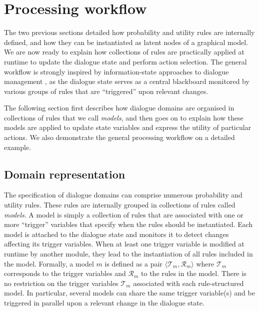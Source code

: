 %

\section{Processing workflow}
\label{sec:processing-workflow}

The two previous sections detailed how probability and utility rules are internally defined, and how they can be instantiated as latent nodes of a graphical model. We are now ready to explain how collections of rules are practically applied at runtime to update the dialogue state and perform action selection. The general workflow is strongly inspired by information-state approaches to dialogue management \citep{Larsson:2000}, as the dialogue state serves as a central blackboard monitored by various groups of rules that are ``triggered'' upon relevant changes. 

The following section first describes how dialogue domains are organised in collections of rules that we call \textit{models}, and then goes on to explain how these models are applied to update state variables and express the utility of particular actions. We also demonstrate the general processing workflow on a detailed example. 


\subsection{Domain representation}

The specification of dialogue domains can comprise numerous probability and utility rules. These rules are internally grouped in collections of rules called \textit{models}. A model is simply a collection of rules that are associated with one or more ``trigger'' variables that specify when the rules should be instantiated. Each model is attached to the dialogue state and monitors it to detect changes affecting its trigger variables. When at least one trigger variable is modified at runtime by another module, they lead to the instantiation of all rules included in the model. Formally, a model $m$ is defined as a pair $\langle \mathcal{T}_m, \mathcal{R}_m \rangle$ where $\mathcal{T}_m$ corresponds to the trigger variables and $\mathcal{R}_m$ to the rules in the model.  There is no restriction on the trigger variables $\mathcal{T}_m$ associated with each rule-structured model.  In particular, several models can share the same trigger variable(s) and be triggered in parallel upon a relevant change in the dialogue state. 

